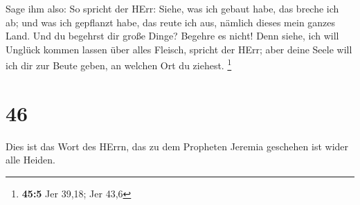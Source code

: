  Sage ihm also: So spricht der HErr: Siehe, was ich gebaut
habe, das breche ich ab; und was ich gepflanzt habe, das reute ich aus,
nämlich dieses mein ganzes Land.  Und du begehrst dir große
Dinge? Begehre es nicht! Denn siehe, ich will Unglück kommen lassen über
alles Fleisch, spricht der HErr; aber deine Seele will ich dir zur Beute
geben, an welchen Ort du ziehest. \footnote{\textbf{45:5} Jer 39,18; Jer
  43,6}

\hypertarget{section-11}{%
\section{46}\label{section-11}}

 Dies ist das Wort des HErrn, das zu dem Propheten Jeremia
geschehen ist wider alle Heiden.

